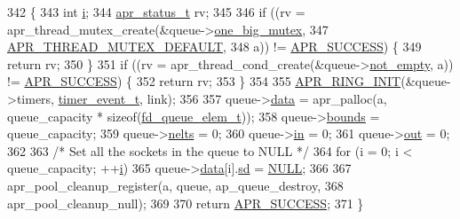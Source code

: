\begin{DoxyCode}
342 \{
343     \textcolor{keywordtype}{int} \hyperlink{group__MOD__PROXY_ga38403a0592eb8018a3ad61aef0f7ca2c}{i};
344     \hyperlink{group__apr__errno_gaa5105fa83cc322f09382292db8b47593}{apr\_status\_t} rv;
345 
346     \textcolor{keywordflow}{if} ((rv = apr\_thread\_mutex\_create(&queue->\hyperlink{structfd__queue__t_af029904f6cc5ddc0afec5df2fadeaef6}{one\_big\_mutex},
347                                       \hyperlink{group__apr__thread__mutex_ga579050872f9aff06e773b084264f7d06}{APR\_THREAD\_MUTEX\_DEFAULT},
348                                       a)) != \hyperlink{group__apr__errno_ga9ee311b7bf1c691dc521d721339ee2a6}{APR\_SUCCESS}) \{
349         \textcolor{keywordflow}{return} rv;
350     \}
351     \textcolor{keywordflow}{if} ((rv = apr\_thread\_cond\_create(&queue->\hyperlink{structfd__queue__t_a18ddd6a916b50d00310ee4ed096a562a}{not\_empty}, a)) != 
      \hyperlink{group__apr__errno_ga9ee311b7bf1c691dc521d721339ee2a6}{APR\_SUCCESS}) \{
352         \textcolor{keywordflow}{return} rv;
353     \}
354 
355     \hyperlink{group__apr__ring_ga245e1a73b162a4a68ebd54c84683729d}{APR\_RING\_INIT}(&queue->timers, \hyperlink{structtimer__event__t}{timer\_event\_t}, link);
356 
357     queue->\hyperlink{structfd__queue__t_af838c3af6ffee37b30bbe8c45e05292b}{data} = apr\_palloc(a, queue\_capacity * \textcolor{keyword}{sizeof}(\hyperlink{structfd__queue__elem__t}{fd\_queue\_elem\_t}));
358     queue->\hyperlink{structfd__queue__t_a4f4edbb981e4bbbc7304ba485b519c09}{bounds} = queue\_capacity;
359     queue->\hyperlink{structfd__queue__t_a064707a5e5c88ee4715ebc0f4ea4abb1}{nelts} = 0;
360     queue->\hyperlink{structfd__queue__t_a17cde346fb215a61f7b2df26970c72bd}{in} = 0;
361     queue->\hyperlink{structfd__queue__t_a85b9339d9c70a03d3ff95ae92061cf70}{out} = 0;
362 
363     \textcolor{comment}{/* Set all the sockets in the queue to NULL */}
364     \textcolor{keywordflow}{for} (i = 0; i < queue\_capacity; ++\hyperlink{group__MOD__PROXY_ga38403a0592eb8018a3ad61aef0f7ca2c}{i})
365         queue->\hyperlink{structfd__queue__t_af838c3af6ffee37b30bbe8c45e05292b}{data}[i].\hyperlink{structfd__queue__elem__t_a04934612aa0f85b323659d652bc061a5}{sd} = \hyperlink{pcre_8txt_ad7f989d16aa8ca809a36bc392c07fba1}{NULL};
366 
367     apr\_pool\_cleanup\_register(a, queue, ap\_queue\_destroy,
368                               apr\_pool\_cleanup\_null);
369 
370     \textcolor{keywordflow}{return} \hyperlink{group__apr__errno_ga9ee311b7bf1c691dc521d721339ee2a6}{APR\_SUCCESS};
371 \}
\end{DoxyCode}


